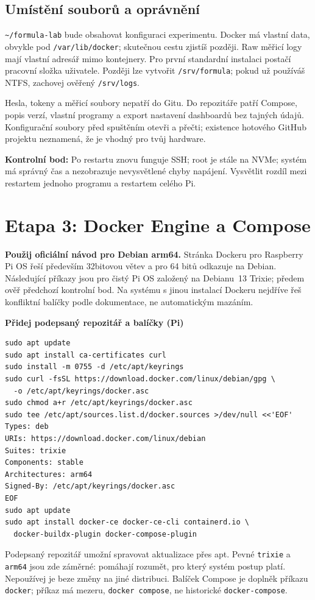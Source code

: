 \documentclass[11pt,a4paper]{article}
\newcommand{\krok}[1]{\par\noindent\textbf{#1}\par}
\newcommand{\kontrola}[1]{\par\noindent\textbf{Kontrolní bod:} #1\par}
\begin{document}
\subsection{Umístění souborů a oprávnění}
\texttt{\textasciitilde/formula-lab} bude obsahovat konfiguraci experimentu. Docker má vlastní data, obvykle pod \texttt{/var/lib/docker}; skutečnou cestu zjistíš později. Raw měřicí logy mají vlastní adresář mimo kontejnery. Pro první standardní instalaci postačí pracovní složka uživatele. Později lze vytvořit \texttt{/srv/formula}; pokud už používáš NTFS, zachovej ověřený \texttt{/srv/logs}.

Hesla, tokeny a měřicí soubory nepatří do Gitu. Do repozitáře patří Compose, popis verzí, vlastní programy a export nastavení dashboardů bez tajných údajů. Konfigurační soubory před spuštěním otevři a přečti; existence hotového GitHub projektu neznamená, že je vhodný pro tvůj hardware.

\kontrola{Po restartu znovu funguje SSH; root je stále na NVMe; systém má správný čas a nezobrazuje nevysvětlené chyby napájení. Vysvětlit rozdíl mezi restartem jednoho programu a restartem celého Pi.}

\clearpage
\section{Etapa 3: Docker Engine a Compose}
\textbf{Použij oficiální návod pro Debian arm64.} Stránka Dockeru pro Raspberry Pi OS řeší především 32bitovou větev a pro 64 bitů odkazuje na Debian. Následující příkazy jsou pro čistý Pi OS založený na Debianu~13 Trixie; předem ověř předchozí kontrolní bod. Na systému s jinou instalací Dockeru nejdříve řeš konfliktní balíčky podle dokumentace, ne automatickým mazáním.\cite{docker-pi,docker-debian}

\krok{Přidej podepsaný repozitář a balíčky (Pi)}
\begin{lstlisting}
sudo apt update
sudo apt install ca-certificates curl
sudo install -m 0755 -d /etc/apt/keyrings
sudo curl -fsSL https://download.docker.com/linux/debian/gpg \
  -o /etc/apt/keyrings/docker.asc
sudo chmod a+r /etc/apt/keyrings/docker.asc
sudo tee /etc/apt/sources.list.d/docker.sources >/dev/null <<'EOF'
Types: deb
URIs: https://download.docker.com/linux/debian
Suites: trixie
Components: stable
Architectures: arm64
Signed-By: /etc/apt/keyrings/docker.asc
EOF
sudo apt update
sudo apt install docker-ce docker-ce-cli containerd.io \
  docker-buildx-plugin docker-compose-plugin
\end{lstlisting}
Podepsaný repozitář umožní spravovat aktualizace přes apt. Pevné \texttt{trixie} a \texttt{arm64} jsou zde záměrné: pomáhají rozumět, pro který systém postup platí. Nepoužívej je beze změny na jiné distribuci. Balíček Compose je doplněk příkazu \texttt{docker}; příkaz má mezeru, \texttt{docker compose}, ne historické \texttt{docker-compose}.
\end{document}
